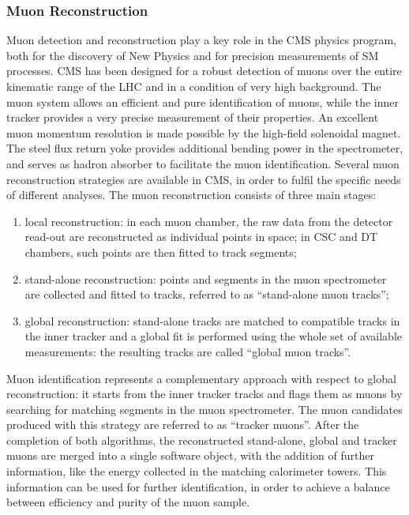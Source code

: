 \subsubsection{Muon Reconstruction}
Muon detection and reconstruction play a key role in the CMS physics program,
both for the discovery of New Physics and for precision measurements of SM
processes. CMS has been designed for a robust detection of muons over the entire
kinematic range of the LHC and in a condition of very high background. The
muon system allows an efficient and pure identification of muons, while the inner
tracker provides a very precise measurement of their properties. An excellent
muon momentum resolution is made possible by the high-field solenoidal magnet.
The steel flux return yoke provides additional bending power in the spectrometer,
and serves as hadron absorber to facilitate the muon identification. Several muon
reconstruction strategies are available in CMS, in order to fulfil the specific needs
of different analyses. The muon reconstruction consists of three main stages:
\begin{enumerate}
\item local reconstruction: in each muon chamber, the raw data from the detector
read-out are reconstructed as individual points in space; in CSC and DT
chambers, such points are then fitted to track segments;
\item stand-alone reconstruction: points and segments in the muon spectrometer
are collected and fitted to tracks, referred to as ``stand-alone muon tracks'';
\item global reconstruction: stand-alone tracks are matched to compatible tracks in
the inner tracker and a global fit is performed using the whole set of available
measurements: the resulting tracks are called ``global muon tracks''.
\end{enumerate}
Muon identification represents a complementary approach with respect to global
reconstruction: it starts from the inner tracker tracks and flags them as muons by
searching for matching segments in the muon spectrometer. The muon candidates
produced with this strategy are referred to as ``tracker muons''.
After the completion of both algorithms, the reconstructed stand-alone, global
and tracker muons are merged into a single software object, with the addition of
further information, like the energy collected in the matching calorimeter towers.
This information can be used for further identification, in order to achieve a balance
between efficiency and purity of the muon sample.

